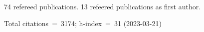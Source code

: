 74 refereed publications. 13 refeered publications as first author.

Total citations~=~3174; h-index~=~31 (2023-03-21)
